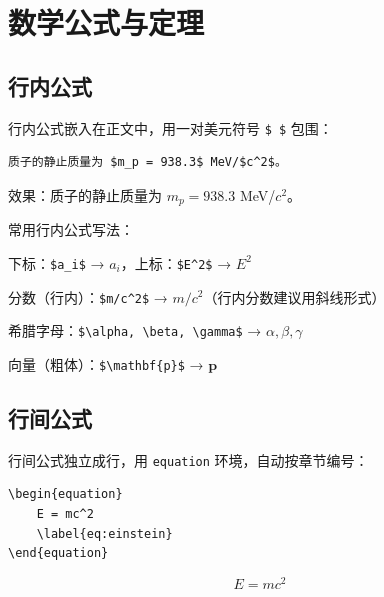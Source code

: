 

\chapter{数学公式与定理}\label{chap:math}

\section{行内公式}

行内公式嵌入在正文中，用一对美元符号 \verb|$ $| 包围：

\begin{verbatim}
质子的静止质量为 $m_p = 938.3$ MeV/$c^2$。
\end{verbatim}

效果：质子的静止质量为 $m_p = 938.3$ MeV/$c^2$。

常用行内公式写法：
\begin{compactitem}
    \item 下标：\verb|$a_i$| → $a_i$，上标：\verb|$E^2$| → $E^2$
    \item 分数（行内）：\verb|$m/c^2$| → $m/c^2$（行内分数建议用斜线形式）
    \item 希腊字母：\verb|$\alpha, \beta, \gamma$| → $\alpha, \beta, \gamma$
    \item 向量（粗体）：\verb|$\mathbf{p}$| → $\mathbf{p}$
\end{compactitem}

\section{行间公式}

行间公式独立成行，用 \texttt{equation} 环境，自动按章节编号：

\begin{verbatim}
\begin{equation}
    E = mc^2
    \label{eq:einstein}
\end{equation}
\end{verbatim}

\begin{equation}
    E = mc^2
    \label{eq:einstein}
\end{equation}

